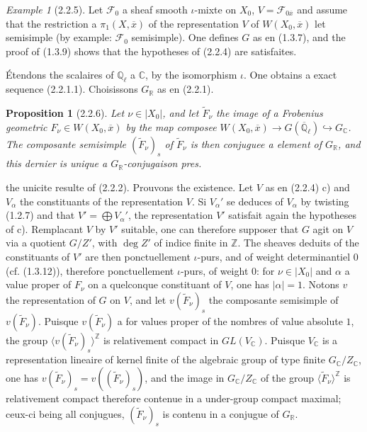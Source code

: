 \documentclass[12pt,a4paper]{article}
\theoremstyle{plain}
\newtheorem{proposition}[theorem]{Proposition}
\theoremstyle{definition}
\theoremstyle{remark}
\newtheorem{example}[theorem]{Example}
\newcommand{\CC}{{\mathbb{C}}}
\newcommand{\QQ}{{\mathbb{Q}}}
\newcommand{\RR}{{\mathbb{R}}}
\newcommand{\ZZ}{{\mathbb{Z}}}
\newcommand{\QQbar}{{\overline{\QQ}}}
\begin{document}
\begin{example}[2.2.5]
Let $\mathscr{F}_0$ a sheaf smooth $\iota$-mixte on $X_0$, $V = \mathscr{F}_{0\overline{x}}$ and assume that the restriction a $\pi_1(X, \overline{x})$ of the representation $V$ of $W(X_0, \overline{x})$ let semisimple (by example: $\mathscr{F}_0$ semisimple). One defines $G$ as en (1.3.7), and the proof of (1.3.9) shows that the hypotheses of (2.2.4) are satisfaites.

\'Etendons the scalaires of $\QQ_\ell$ a $\CC$, by the isomorphism $\iota$. One obtains a exact sequence (2.2.1.1). Choisissons $G_\RR$ as en (2.2.1).
\end{example}

\begin{proposition}[2.2.6]
Let $\nu \in |X_0|$, and let $\tilde{F}_\nu$ the image of a Frobenius geometric $F_\nu \in W(X_0, \overline{x})$ by the map composee $W(X_0, \overline{x}) \to G(\QQbar_\ell) \hookrightarrow G_\CC$. The composante semisimple $(\tilde{F}_\nu)_s$ of $\tilde{F}_\nu$ is then conjuguee a element of $G_\RR$, and this dernier is unique a $G_\RR$-conjugaison pres.
\end{proposition}

the unicite resulte of (2.2.2). Prouvons the existence. Let $V$ as en (2.2.4) c) and $V_\alpha$ the constituants of the representation $V$. Si $V_\alpha'$ se deduces of $V_\alpha$ by twisting (1.2.7) and that $V' = \bigoplus V_\alpha'$, the representation $V'$ satisfait again the hypotheses of c). Remplacant $V$ by $V'$ suitable, one can therefore supposer that $G$ agit on $V$ via a quotient $G/Z'$, with $\deg Z'$ of indice finite in $\ZZ$. The sheaves deduits of the constituants of $V'$ are then ponctuellement $\iota$-purs, and of weight determinantiel $0$ (cf. (1.3.12)), therefore ponctuellement $\iota$-purs, of weight $0$: for $\nu \in |X_0|$ and $\alpha$ a value proper of $F_\nu$ on a quelconque constituant of $V$, one has $|\alpha| = 1$. Notons $v$ the representation of $G$ on $V$, and let $v(\tilde{F}_\nu)_s$ the composante semisimple of $v(\tilde{F}_\nu)$. Puisque $v(\tilde{F}_\nu)$ a for values proper of the nombres of value absolute $1$, the group $\langle v(\tilde{F}_\nu)_s \rangle^{\ZZ}$ is relativement compact in $GL(V_\CC)$. Puisque $V_\CC$ is a representation lineaire of kernel finite of the algebraic group of type finite $G_\CC/Z_\CC$, one has $v(\tilde{F}_\nu)_s = v((\tilde{F}_\nu)_s)$, and the image in $G_\CC/Z_\CC$ of the group $\langle \tilde{F}_\nu \rangle^{\ZZ}$ is relativement compact therefore contenue in a under-group compact maximal; ceux-ci being all conjugues, $(\tilde{F}_\nu)_s$ is contenu in a conjugue of $G_\RR$.
\end{document}

